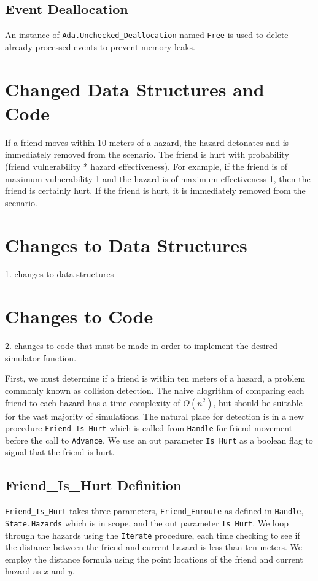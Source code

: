 \documentclass[12pt,letterpaper,titlepage]{article}
\newcommand{\code}[1]{\texttt{#1}}
\begin{document}
\subsection{Event Deallocation}

An instance of \code{Ada.Unchecked_Deallocation} named \code{Free} is
used to delete already processed events to prevent memory leaks.


\section{Changed Data Structures and Code}

If a friend moves within 10 meters of a hazard, the hazard detonates
and is immediately removed from the scenario.  The friend is hurt with
probability = (friend vulnerability * hazard effectiveness).  For
example, if the friend is of maximum vulnerability 1 and the hazard is
of maximum effectiveness 1, then the friend is certainly hurt.  If the
friend is hurt, it is immediately removed from the scenario.

\section{Changes to Data Structures}
1. changes to data structures


\section{Changes to Code}
2. changes to code that must be made in order to implement the desired
simulator function.

First, we must determine if a friend is within ten meters of a hazard,
a problem commonly known as collision detection.  The naive alogrithm
of comparing each friend to each hazard has a time complexity of
$O(n^2)$, but should be suitable for the vast majority of simulations.
The natural place for detection is in a new procedure
\code{Friend_Is_Hurt} which is called from \code{Handle} for friend
movement before the call to \code{Advance}.  We use an out parameter
\code{Is_Hurt} as a boolean flag to signal that the friend is hurt.

\subsection{Friend_Is_Hurt Definition}
\code{Friend_Is_Hurt} takes three parameters, \code{Friend_Enroute} as
defined in \code{Handle}, \code{State.Hazards} which is in scope, and
the out parameter \code{Is_Hurt}.  We loop through the hazards using
the \code{Iterate} procedure, each time checking to see if the
distance between the friend and current hazard is less than ten
meters.  We employ the distance formula using the point locations of
the friend and current hazard as $x$ and $y$.
\end{document}
